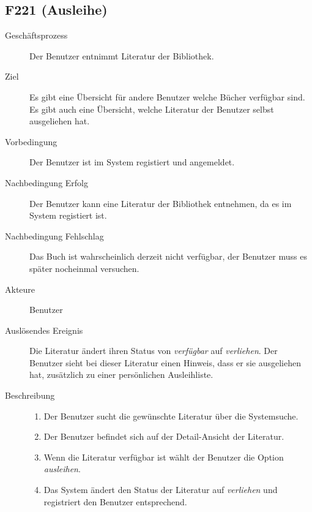 \subsection{F221 (Ausleihe)}
\begin{description}
  \item[Geschäftsprozess]Der Benutzer entnimmt Literatur der Bibliothek.
  \item[Ziel]Es gibt eine Übersicht für andere Benutzer welche Bücher verfügbar sind. Es gibt auch eine Übersicht, welche Literatur der Benutzer selbst ausgeliehen hat.
  \item[Vorbedingung]Der Benutzer ist im System registiert und angemeldet.
  \item[Nachbedingung Erfolg]Der Benutzer kann eine Literatur der Bibliothek entnehmen, da es im System registiert ist.
  \item[Nachbedingung Fehlschlag]Das Buch ist wahrscheinlich derzeit nicht verfügbar, der Benutzer muss es später nocheinmal versuchen.
  \item[Akteure]Benutzer
  \item[Auslösendes Ereignis]Die Literatur ändert ihren Status von \emph{verfügbar} auf \emph{verliehen}. Der Benutzer sieht bei dieser Literatur einen Hinweis, dass er sie ausgeliehen hat, zusätzlich zu einer persönlichen Ausleihliste.
  \item[Beschreibung]
    \begin{enumerate}
      \item Der Benutzer sucht die gewünschte Literatur über die Systemsuche.
      \item Der Benutzer befindet sich auf der Detail-Ansicht der Literatur.
      \item Wenn die Literatur verfügbar ist wählt der Benutzer die Option \emph{ausleihen}.
      \item Das System ändert den Status der Literatur auf \emph{verliehen} und registriert den Benutzer entsprechend.
    \end{enumerate}
\end{description}

